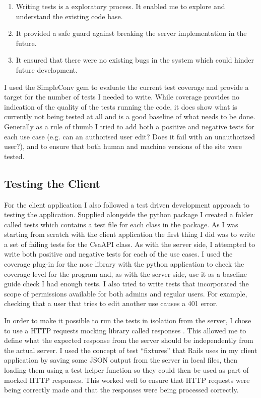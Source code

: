 \documentclass[paper=a4, fontsize=11pt]{scrartcl}	%
\numberwithin{equation}{section}															%
\numberwithin{figure}{section}																%
\numberwithin{table}{section}
\begin{document}
\begin{enumerate}
\item Writing tests is a exploratory process. It enabled me to explore and understand the existing code base.
\item It provided a safe guard against breaking the server implementation in the future.
\item It ensured that there were no existing bugs in the system which could hinder future development.
\end{enumerate}

I used the SimpleConv gem \cite{librarySimpleConv} to evaluate the current test coverage and provide a target for the number of tests I needed to write. While coverage provides no indication of the quality of the tests running the code, it does show what is currently not being tested at all and is a good baseline of what needs to be done. Generally as a rule of thumb I tried to add both a positive and negative tests for each use case (e.g. can an authorised user edit? Does it fail with an unauthorized user?), and to ensure that both human and machine versions of the site were tested.

\subsection{Testing the Client}
\label{subsec:client-testing}
For the client application I also followed a test driven development approach to testing the application. Supplied alongside the python package I created a folder called tests which contains a test file for each class in the package. As I was starting from scratch with the client application the first thing I did was to write a set of failing tests for the CsaAPI class. As with the server side, I attempted to write both positive and negative tests for each of the use cases. I used the coverage plug-in for the nose library \cite{libraryNose} with the python application to check the coverage level for the program and, as with the server side, use it as a baseline guide check I had enough tests. I also tried to write tests that incorporated the scope of permissions available for both admins and regular users. For example, checking that a user that tries to edit another use causes a 401 error. 

In order to make it possible to run the tests in isolation from the server, I chose to use a HTTP requests mocking library called responses \cite{libraryResponses}. This allowed me to define what the expected response from the server should be independently from the actual server. I used the concept of test ``fixtures'' that Rails uses in my client application by saving some JSON output from the server in local files, then loading them using a test helper function so they could then be used as part of mocked HTTP responses. This worked well to ensure that HTTP requests were being correctly made and that the responses were being processed correctly.
\end{document}
